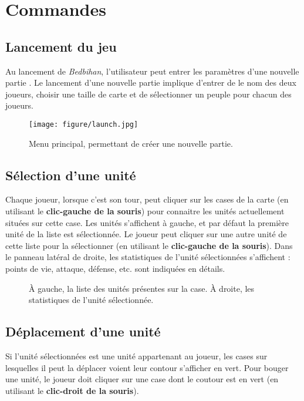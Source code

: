 \newpage
\section{Commandes}

		\subsection{Lancement du jeu}

		Au lancement de \emph{Bedbihan}, l'utilisateur peut entrer les paramètres d'une nouvelle partie . Le lancement d'une nouvelle partie implique d'entrer de le nom des deux joueurs, choisir une taille de carte et de sélectionner un peuple pour chacun des joueurs.
		
		\begin{figure}[h!]
			\begin{center}
				\texttt{[image: figure/launch.jpg]}
			\end{center}
			\caption{Menu principal, permettant de créer une nouvelle partie.}
			\label{fig:launch}
		\end{figure}

		\subsection{Sélection d'une unité}
		Chaque joueur, lorsque c'est son tour, peut cliquer sur les cases de la carte (en utilisant le {\bf clic-gauche de la souris}) pour connaitre les unités actuellement situées sur cette case. Les unités s'affichent à gauche, et par défaut la première unité de la liste est sélectionnée. Le joueur peut cliquer sur une autre unité de cette liste pour la sélectionner (en utilisant le {\bf clic-gauche de la souris}). Dans le panneau latéral de droite, les statistiques de l'unité sélectionnées s'affichent : points de vie, attaque, défense, etc. sont indiquées en détails.
		
		\begin{figure}[h!]
			\begin{center}
			\end{center}
			\caption{À gauche, la liste des unités présentes sur la case. À droite, les statistiques de l'unité sélectionnée.}
			\label{fig:launch}
		\end{figure}
		
		\subsection{Déplacement d'une unité}
		Si l'unité sélectionnées est une unité appartenant au joueur, les cases sur lesquelles il peut la déplacer voient leur contour s'afficher en vert. Pour bouger une unité, le joueur doit cliquer sur une case dont le coutour est en vert (en utilisant le {\bf clic-droit de la souris}).
		
